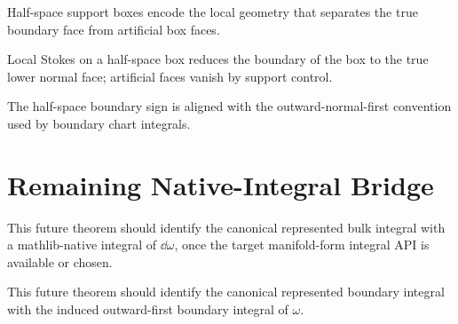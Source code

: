 \begin{definition}
  \label{def:halfspace_support_box}
  \leanok
  Half-space support boxes encode the local geometry that separates the true
  boundary face from artificial box faces.
\end{definition}

\begin{theorem}
  \label{thm:halfspace_local_stokes}
  \leanok
  Local Stokes on a half-space box reduces the boundary of the box to the true
  lower normal face; artificial faces vanish by support control.
\end{theorem}

\begin{definition}
  \label{def:boundary_sign_convention}
  \leanok
  The half-space boundary sign is aligned with the outward-normal-first
  convention used by boundary chart integrals.
\end{definition}

\section{Remaining Native-Integral Bridge}
\label{sec:global_assembly}

\begin{theorem}
  \label{thm:represented_to_native_bulk}
  This future theorem should identify the canonical represented bulk integral
  with a mathlib-native integral of \(\dd\omega\), once the target manifold-form
  integral API is available or chosen.
\end{theorem}

\begin{theorem}
  \label{thm:represented_to_native_boundary}
  This future theorem should identify the canonical represented boundary
  integral with the induced outward-first boundary integral of \(\omega\).
\end{theorem}

